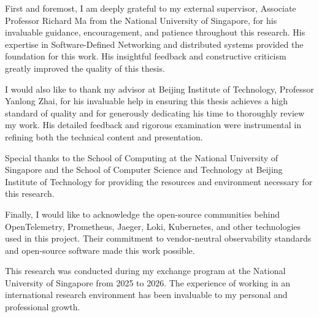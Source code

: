 
\begin{acknowledgements}

First and foremost, I am deeply grateful to my external supervisor, Associate Professor Richard Ma from the National University of Singapore, for his invaluable guidance, encouragement, and patience throughout this research. His expertise in Software-Defined Networking and distributed systems provided the foundation for this work. His insightful feedback and constructive criticism greatly improved the quality of this thesis.

I would also like to thank my advisor at Beijing Institute of Technology, Professor Yanlong Zhai, for his invaluable help in ensuring this thesis achieves a high standard of quality and for generously dedicating his time to thoroughly review my work. His detailed feedback and rigorous examination were instrumental in refining both the technical content and presentation.

Special thanks to the School of Computing at the National University of Singapore and the School of Computer Science and Technology at Beijing Institute of Technology for providing the resources and environment necessary for this research.

Finally, I would like to acknowledge the open-source communities behind OpenTelemetry, Prometheus, Jaeger, Loki, Kubernetes, and other technologies used in this project. Their commitment to vendor-neutral observability standards and open-source software made this work possible.

This research was conducted during my exchange program at the National University of Singapore from 2025 to 2026. The experience of working in an international research environment has been invaluable to my personal and professional growth.

\end{acknowledgements}
